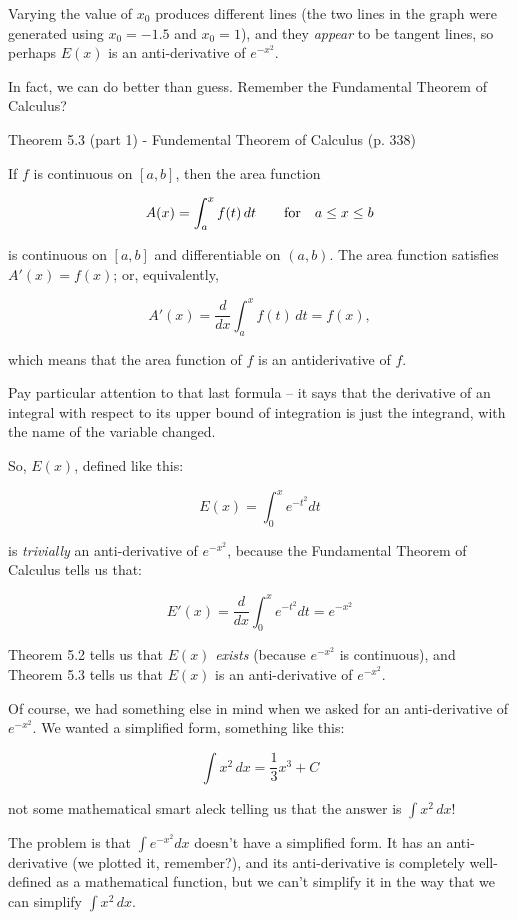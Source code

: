 Varying the value of $x_0$ produces different lines (the two lines in the graph were generated using $x_0 = -1.5$ and $x_0=1$),
and they {\it appear} to be tangent
lines, so perhaps $E(x)$ is an anti-derivative of $e^{-x^2}$.

In fact, we can do better than guess.  Remember the Fundamental Theorem of Calculus?


\begin{framed}
\cite{briggs} Theorem 5.3 (part 1) - Fundemental Theorem of Calculus (p. 338)

If $f$ is continuous on $[a,b]$, then the area function

$$A(x) = \int_a^x f(t)\, dt \qquad {\rm for\quad} a \le x \le b$$

is continuous on $[a,b]$ and differentiable on $(a,b)$.  The area function satisfies $A'(x) = f(x)$; or, equivalently,

$$A'(x) = \frac{d}{dx} \int_a^x f(t)\, dt = f(x),$$

which means that the area function of $f$ is an antiderivative of $f$.
\end{framed}

Pay particular attention to that last formula -- it says that the derivative of an integral with respect
to its upper bound of integration is just the integrand, with the name of the variable changed.

So, $E(x)$, defined like this:

$$E(x) = \int_0^x e^{-t^2} dt$$

is {\it trivially} an anti-derivative of $e^{-x^2}$, because the Fundamental Theorem of Calculus tells us that:

$$E'(x) = \frac{d}{dx} \int_0^x e^{-t^2} dt = e^{-x^2}$$

\cite{briggs} Theorem 5.2 tells us that $E(x)$ {\it exists} (because $e^{-x^2}$ is continuous), and \cite{briggs} Theorem 5.3 tells
us that $E(x)$ is an anti-derivative of $e^{-x^2}$.

Of course, we had something else in mind when we asked for an anti-derivative of $e^{-x^2}$.  We wanted
a simplified form, something like this:

$$\int x^2\,dx = \frac{1}{3} x^3 + C$$

not some mathematical smart aleck telling us that the answer is $\int x^2\,dx$!

The problem is that $\int e^{-x^2} dx$ doesn't have a simplified form.  It has an anti-derivative
(we plotted it, remember?), and its anti-derivative is completely well-defined as a mathematical function, but we
can't simplify it in the way that we can simplify $\int x^2\,dx$.

